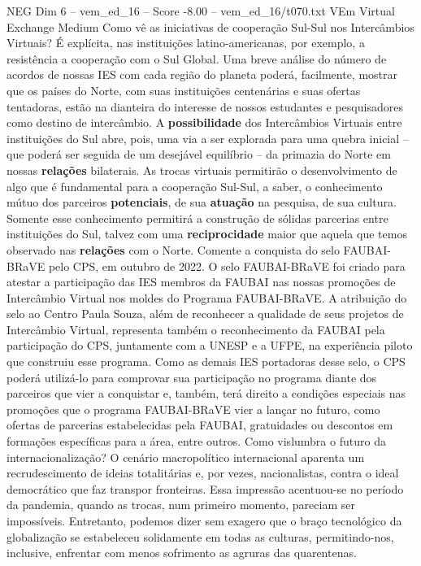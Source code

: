 \begin{textsample}{NEG Dim 6 – vem\_ed\_16 – Score -8.00 – vem\_ed\_16/t070.txt}  \label{ex:f6_neg_015}
VEm Virtual Exchange Medium Como vê as iniciativas de cooperação Sul-Sul nos Intercâmbios Virtuais?
É explícita, nas instituições latino-americanas, por exemplo, a resistência a cooperação com o Sul Global.
Uma breve análise do número de acordos de nossas IES com cada região do planeta poderá, facilmente, mostrar que os países do Norte, com suas instituições centenárias e suas ofertas tentadoras, estão na dianteira do interesse de nossos estudantes e pesquisadores como destino de intercâmbio.
A \textbf{possibilidade} dos Intercâmbios Virtuais entre instituições do Sul abre, pois, uma via a ser explorada para uma quebra inicial – que poderá ser seguida de um desejável equilíbrio – da primazia do Norte em nossas \textbf{relações} bilaterais.
As trocas virtuais permitirão o desenvolvimento de algo que é fundamental para a cooperação Sul-Sul, a saber, o conhecimento mútuo dos parceiros \textbf{potenciais}, de sua \textbf{atuação} na pesquisa, de sua cultura.
Somente esse conhecimento permitirá a construção de sólidas parcerias entre instituições do Sul, talvez com uma \textbf{reciprocidade} maior que aquela que temos observado nas \textbf{relações} com o Norte.
Comente a conquista do selo FAUBAI-BRaVE pelo CPS, em outubro de 2022.
O selo FAUBAI-BRaVE foi criado para atestar a participação das IES membros da FAUBAI nas nossas promoções de Intercâmbio Virtual nos moldes do Programa FAUBAI-BRaVE.
A atribuição do selo ao Centro Paula Souza, além de reconhecer a qualidade de seus projetos de Intercâmbio Virtual, representa também o reconhecimento da FAUBAI pela participação do CPS, juntamente com a UNESP e a UFPE, na experiência piloto que construiu esse programa.
Como as demais IES portadoras desse selo, o CPS poderá utilizá-lo para comprovar sua participação no programa diante dos parceiros que vier a conquistar e, também, terá direito a condições especiais nas promoções que o programa FAUBAI-BRaVE vier a lançar no futuro, como ofertas de parcerias estabelecidas pela FAUBAI, gratuidades ou descontos em formações específicas para a área, entre outros.
Como vislumbra o futuro da internacionalização?
O cenário macropolítico internacional aparenta um recrudescimento de ideias totalitárias e, por vezes, nacionalistas, contra o ideal democrático que faz transpor fronteiras.
Essa impressão acentuou-se no período da pandemia, quando as trocas, num primeiro momento, pareciam ser impossíveis.
Entretanto, podemos dizer sem exagero que o braço tecnológico da globalização se estabeleceu solidamente em todas as culturas, permitindo-nos, inclusive, enfrentar com menos sofrimento as agruras das quarentenas.

\end{textsample}
